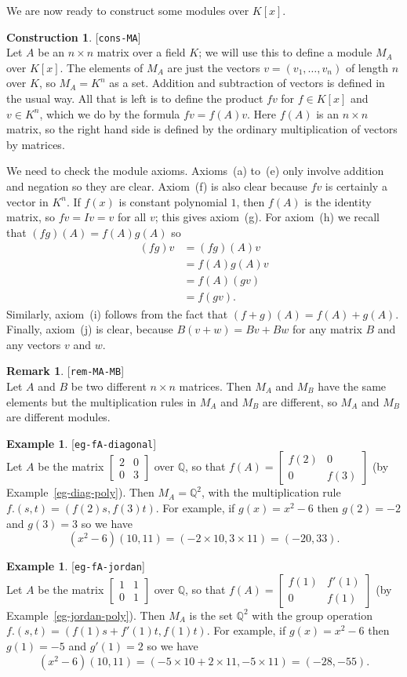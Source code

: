 \documentclass{amsart}
\newcommand{\lbl}[1]{\label{#1}\textup{[\texttt{#1}]}\ \\}
\newcommand{\lbl}{\label}
\newcommand{\bsm}       {\left[\begin{smallmatrix}}
\newcommand{\esm}       {\end{smallmatrix}\right]}
\newcommand{\Q}         {{\mathbb{Q}}}
\newcommand{\tm}        {\times}
\renewcommand{\:}{\colon}
\theoremstyle{definition}
\newtheorem{remark}[theorem]{Remark}
\newtheorem{construction}[theorem]{Construction}
\newtheorem{example}[theorem]{Example}
\begin{document}
We are now ready to construct some modules over $K[x]$.
\begin{construction}\lbl{cons-MA}
 Let $A$ be an $n\tm n$ matrix over a field $K$; we will use this to
 define a module $M_A$ over $K[x]$.  The elements of $M_A$ are just
 the vectors $v=(v_1,\ldots,v_n)$ of length $n$ over $K$, so $M_A=K^n$
 as a set.  Addition and subtraction of vectors is defined in the
 usual way.  All that is left is to define the product $fv$ for
 $f\in K[x]$ and $v\in K^n$, which we do by the formula $fv=f(A)v$.
 Here $f(A)$ is an $n\tm n$ matrix, so the right hand side is defined
 by the ordinary multiplication of vectors by matrices.

 We need to check the module axioms.  Axioms~(a) to~(e) only involve
 addition and negation so they are clear.  Axiom~(f) is also clear
 because $fv$ is certainly a vector in $K^n$.  If $f(x)$ is constant
 polynomial $1$, then $f(A)$ is the identity matrix, so $fv=Iv=v$ for
 all $v$; this gives axiom~(g).  For axiom~(h) we recall that
 $(fg)(A)=f(A)g(A)$ so
 \begin{align*}
  (fg)v &= (fg)(A)v \\
        &= f(A)g(A)v \\
        &= f(A)(gv) \\
        &= f(gv).
 \end{align*}
 Similarly, axiom~(i) follows from the fact that
 $(f+g)(A)=f(A)+g(A)$.  Finally, axiom~(j) is clear, because
 $B(v+w)=Bv+Bw$ for any matrix $B$ and any vectors $v$ and $w$.
\end{construction}
\begin{remark}\lbl{rem-MA-MB}
 Let $A$ and $B$ be two different $n\tm n$ matrices.  Then $M_A$ and
 $M_B$ have the same elements but the multiplication rules in $M_A$
 and $M_B$ are different, so $M_A$ and $M_B$ are different modules.
\end{remark}
\begin{example}\lbl{eg-fA-diagonal}
 Let $A$ be the matrix $\bsm 2&0\\0&3\esm$ over $\Q$, so that
 $f(A)=\bsm f(2)&0\\0&f(3)\esm$ (by Example~\ref{eg-diag-poly}).  Then
 $M_A=\Q^2$, with the multiplication rule $f.(s,t)=(f(2)s,f(3)t)$.  For
 example, if $g(x)=x^2-6$ then $g(2)=-2$ and $g(3)=3$ so we have
 \[ (x^2-6)(10,11) = (-2\tm 10,3\tm 11) = (-20,33). \]
\end{example}
\begin{example}\lbl{eg-fA-jordan}
 Let $A$ be the matrix $\bsm 1&1\\0&1\esm$ over $\Q$, so that
 $f(A)=\bsm f(1)&f'(1)\\0&f(1)\esm$ (by Example~\ref{eg-jordan-poly}).
 Then $M_A$ is the set $\Q^2$ with the group operation
 $f.(s,t)=(f(1)s+f'(1)t,f(1)t)$.  For example, if $g(x)=x^2-6$ then
 $g(1)=-5$ and $g'(1)=2$ so we have
 \[ (x^2-6)(10,11)=(-5\tm 10+2\tm 11,-5\tm 11)=(-28,-55). \]
\end{example}
\end{document}
